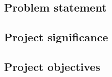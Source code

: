 \documentclass[../main.tex]{subfiles}
\begin{document}
\subsection{Problem statement}

\blindtext

\subsection{Project significance}

\blindtext

\subsection{Project objectives}

\blindtext
\end{document}
